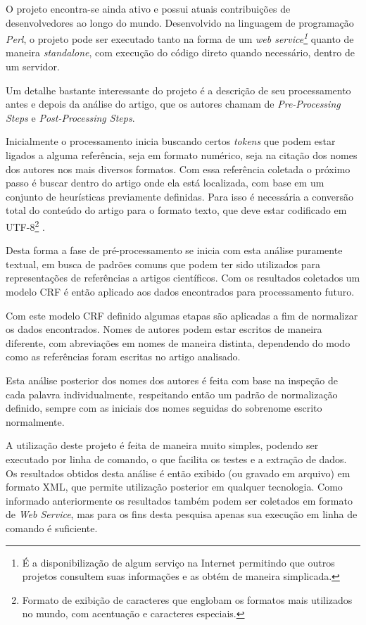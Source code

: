 O projeto encontra-se ainda ativo e possui atuais contribuições de desenvolvedores ao longo do mundo. Desenvolvido na linguagem de programação \textit{Perl}, o projeto pode ser executado tanto na forma de um \textit{web service\footnote{É a disponibilização de algum serviço na Internet permitindo que outros projetos consultem suas informações e as obtém de maneira simplicada.}} quanto de maneira \textit{standalone}, com execução do código direto quando necessário, dentro de um servidor.

Um detalhe bastante interessante do projeto é a descrição de seu processamento antes e depois da análise do artigo, que os autores chamam de \textit{Pre-Processing Steps} e \textit{Post-Processing Steps}.

Inicialmente o processamento inicia buscando certos \textit{tokens} que podem estar ligados a alguma referência, seja em formato numérico, seja na citação dos nomes dos autores nos mais diversos formatos. Com essa referência coletada o próximo passo é buscar dentro do artigo onde ela está localizada, com base em um conjunto de heurísticas previamente definidas. Para isso é necessária a conversão total do conteúdo do artigo para o formato texto, que deve estar codificado em UTF-8\footnote{Formato de exibição de caracteres que englobam os formatos mais utilizados no mundo, com acentuação e caracteres especiais.} \cite{Councill-Giles-2008-ParsCit}.

Desta forma a fase de pré-processamento se inicia com esta análise puramente textual, em busca de padrões comuns que podem ter sido utilizados para representações de referências a artigos científicos. Com os resultados coletados um modelo CRF é então aplicado aos dados encontrados para processamento futuro.

Com este modelo CRF definido algumas etapas são aplicadas a fim de normalizar os dados encontrados. Nomes de autores podem estar escritos de maneira diferente, com abreviações em nomes de maneira distinta, dependendo do modo como as referências foram escritas no artigo analisado.

Esta análise posterior dos nomes dos autores é feita com base na inspeção de cada palavra individualmente, respeitando então um padrão de normalização definido, sempre com as iniciais dos nomes seguidas do sobrenome escrito normalmente.

A utilização deste projeto é feita de maneira muito simples, podendo ser executado por linha de comando, o que facilita os testes e a extração de dados. Os resultados obtidos desta análise é então exibido (ou gravado em arquivo) em formato XML, que permite utilização posterior em qualquer tecnologia. Como informado anteriormente os resultados também podem ser coletados em formato de \textit{Web Service}, mas para os fins desta pesquisa apenas sua execução em linha de comando é suficiente.

